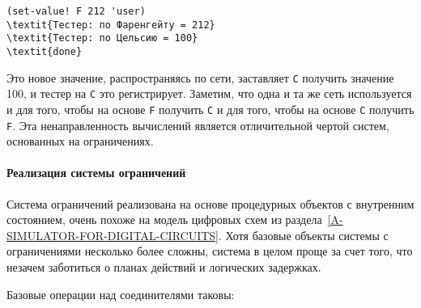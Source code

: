 \begin{Verbatim}[fontsize=\small]
(set-value! F 212 'user)
\textit{Тестер: по Фаренгейту = 212}
\textit{Тестер: по Цельсию = 100}
\textit{done}
\end{Verbatim}
Это новое значение, распространяясь по сети, заставляет {\tt C}
получить значение 100, и тестер на {\tt C} это регистрирует.
Заметим, что одна и та же сеть используется и для того, чтобы на основе
{\tt F} получить {\tt C} и для того, чтобы на основе
{\tt C} получить {\tt F}.  Эта ненаправленность
вычислений является отличительной чертой систем, основанных на
ограничениях.

\paragraph{Реализация системы ограничений}


Система ограничений реализована на основе процедурных
объектов с внутренним состоянием, очень похоже на модель цифровых схем
из раздела~\ref{A-SIMULATOR-FOR-DIGITAL-CIRCUITS}.  Хотя
базовые объекты системы с ограничениями несколько более сложны, система в
целом проще за счет того, что незачем заботиться о планах действий и логических
задержках.

Базовые операции над соединителями таковы:

